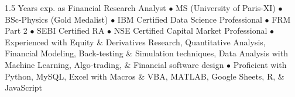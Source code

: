 \par{\vspace*{-15px}

1.5 Years exp. as Financial Research Analyst $\bullet$ MS (University of Paris-XI) $\bullet$ BSc-Physics (Gold Medalist) $\bullet$ IBM Certified Data Science Professional $\bullet$ FRM Part 2 $\bullet$ SEBI Certified RA $\bullet$ NSE Certified Capital Market Professional $\bullet$ Experienced with Equity \& Derivatives Research, Quantitative Analysis, Financial Modeling, Back-testing \& Simulation techniques, Data Analysis with Machine Learning, Algo-trading, \& Financial software design $\bullet$ Proficient with Python, MySQL, Excel with Macros \& VBA, MATLAB, Google Sheets, R, \& JavaScript}